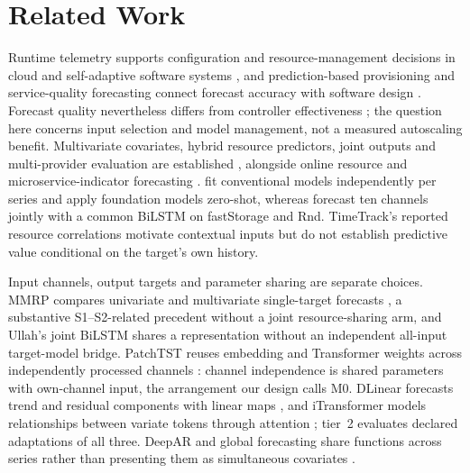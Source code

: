 \documentclass[5p,twocolumn]{elsarticle}
\begin{document}
\section{Related Work}
\label{sec:related-work}

Runtime telemetry supports configuration and resource-management decisions in
cloud and self-adaptive software systems
\citep{Taherizadeh2018Monitoring,Bauer2020SelfAware}, and prediction-based
provisioning and service-quality forecasting connect forecast accuracy with
software design \citep{Calheiros2015ARIMA,Syu2017DynamicQoS}. Forecast quality
nevertheless differs from controller effectiveness \citep{Qu2018Autoscaling};
the question here concerns input selection and model management, not a
measured autoscaling benefit. Multivariate covariates, hybrid resource
predictors, joint outputs and multi-provider evaluation are established
\citep{Tran2018MultivariateFuzzy,Xu2022esDNN,Tripathi2025MMRP,
Rossi2025CloudUncertainty,Zhang2025SWTCLSTM}, alongside online resource and
microservice-indicator forecasting \citep{Gao2026OMCR,Gao2026MaMiClif}.
\citet{DiMenna2026RuntimeForecasting} fit conventional models independently
per series and apply foundation models zero-shot, whereas
\citet{Ullah2023CloudBiLSTM} forecast ten channels jointly with a common
BiLSTM on fastStorage and Rnd. TimeTrack's reported resource correlations
\citep{Meliani2025TimeTrack} motivate contextual inputs but do not establish
predictive value conditional on the target's own history.

Input channels, output targets and parameter sharing are separate choices.
MMRP compares univariate and multivariate single-target forecasts
\citep{Tripathi2025MMRP}, a substantive S1--S2-related precedent without a
joint resource-sharing arm, and Ullah's joint BiLSTM shares a representation
without an independent all-input target-model bridge. PatchTST reuses
embedding and Transformer weights across independently processed channels
\citep{Nie2023PatchTST}: channel independence is shared parameters with
own-channel input, the arrangement our design calls M0. DLinear forecasts
trend and residual components with linear maps \citep{Zeng2023DLinear}, and
iTransformer models relationships between variate tokens through attention
\citep{Liu2024iTransformer}; tier~2 evaluates declared adaptations of all
three. DeepAR and global forecasting share functions across series rather
than presenting them as simultaneous covariates
\citep{Salinas2020DeepAR,MonteroManso2021GlobalForecasting}.
\end{document}
